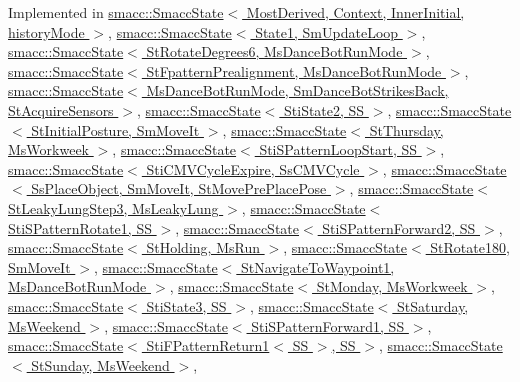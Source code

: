 Implemented in \hyperlink{classsmacc_1_1SmaccState_afc39f8e0ca4001b2159a100da2fccd0e}{smacc\+::\+Smacc\+State$<$ Most\+Derived, Context, Inner\+Initial, history\+Mode $>$}, \hyperlink{classsmacc_1_1SmaccState_afc39f8e0ca4001b2159a100da2fccd0e}{smacc\+::\+Smacc\+State$<$ State1, Sm\+Update\+Loop $>$}, \hyperlink{classsmacc_1_1SmaccState_afc39f8e0ca4001b2159a100da2fccd0e}{smacc\+::\+Smacc\+State$<$ St\+Rotate\+Degrees6, Ms\+Dance\+Bot\+Run\+Mode $>$}, \hyperlink{classsmacc_1_1SmaccState_afc39f8e0ca4001b2159a100da2fccd0e}{smacc\+::\+Smacc\+State$<$ St\+Fpattern\+Prealignment, Ms\+Dance\+Bot\+Run\+Mode $>$}, \hyperlink{classsmacc_1_1SmaccState_afc39f8e0ca4001b2159a100da2fccd0e}{smacc\+::\+Smacc\+State$<$ Ms\+Dance\+Bot\+Run\+Mode, Sm\+Dance\+Bot\+Strikes\+Back, St\+Acquire\+Sensors $>$}, \hyperlink{classsmacc_1_1SmaccState_afc39f8e0ca4001b2159a100da2fccd0e}{smacc\+::\+Smacc\+State$<$ Sti\+State2, S\+S $>$}, \hyperlink{classsmacc_1_1SmaccState_afc39f8e0ca4001b2159a100da2fccd0e}{smacc\+::\+Smacc\+State$<$ St\+Initial\+Posture, Sm\+Move\+It $>$}, \hyperlink{classsmacc_1_1SmaccState_afc39f8e0ca4001b2159a100da2fccd0e}{smacc\+::\+Smacc\+State$<$ St\+Thursday, Ms\+Workweek $>$}, \hyperlink{classsmacc_1_1SmaccState_afc39f8e0ca4001b2159a100da2fccd0e}{smacc\+::\+Smacc\+State$<$ Sti\+S\+Pattern\+Loop\+Start, S\+S $>$}, \hyperlink{classsmacc_1_1SmaccState_afc39f8e0ca4001b2159a100da2fccd0e}{smacc\+::\+Smacc\+State$<$ Sti\+C\+M\+V\+Cycle\+Expire, Ss\+C\+M\+V\+Cycle $>$}, \hyperlink{classsmacc_1_1SmaccState_afc39f8e0ca4001b2159a100da2fccd0e}{smacc\+::\+Smacc\+State$<$ Ss\+Place\+Object, Sm\+Move\+It, St\+Move\+Pre\+Place\+Pose $>$}, \hyperlink{classsmacc_1_1SmaccState_afc39f8e0ca4001b2159a100da2fccd0e}{smacc\+::\+Smacc\+State$<$ St\+Leaky\+Lung\+Step3, Ms\+Leaky\+Lung $>$}, \hyperlink{classsmacc_1_1SmaccState_afc39f8e0ca4001b2159a100da2fccd0e}{smacc\+::\+Smacc\+State$<$ Sti\+S\+Pattern\+Rotate1, S\+S $>$}, \hyperlink{classsmacc_1_1SmaccState_afc39f8e0ca4001b2159a100da2fccd0e}{smacc\+::\+Smacc\+State$<$ Sti\+S\+Pattern\+Forward2, S\+S $>$}, \hyperlink{classsmacc_1_1SmaccState_afc39f8e0ca4001b2159a100da2fccd0e}{smacc\+::\+Smacc\+State$<$ St\+Holding, Ms\+Run $>$}, \hyperlink{classsmacc_1_1SmaccState_afc39f8e0ca4001b2159a100da2fccd0e}{smacc\+::\+Smacc\+State$<$ St\+Rotate180, Sm\+Move\+It $>$}, \hyperlink{classsmacc_1_1SmaccState_afc39f8e0ca4001b2159a100da2fccd0e}{smacc\+::\+Smacc\+State$<$ St\+Navigate\+To\+Waypoint1, Ms\+Dance\+Bot\+Run\+Mode $>$}, \hyperlink{classsmacc_1_1SmaccState_afc39f8e0ca4001b2159a100da2fccd0e}{smacc\+::\+Smacc\+State$<$ St\+Monday, Ms\+Workweek $>$}, \hyperlink{classsmacc_1_1SmaccState_afc39f8e0ca4001b2159a100da2fccd0e}{smacc\+::\+Smacc\+State$<$ Sti\+State3, S\+S $>$}, \hyperlink{classsmacc_1_1SmaccState_afc39f8e0ca4001b2159a100da2fccd0e}{smacc\+::\+Smacc\+State$<$ St\+Saturday, Ms\+Weekend $>$}, \hyperlink{classsmacc_1_1SmaccState_afc39f8e0ca4001b2159a100da2fccd0e}{smacc\+::\+Smacc\+State$<$ Sti\+S\+Pattern\+Forward1, S\+S $>$}, \hyperlink{classsmacc_1_1SmaccState_afc39f8e0ca4001b2159a100da2fccd0e}{smacc\+::\+Smacc\+State$<$ Sti\+F\+Pattern\+Return1$<$ S\+S $>$, S\+S $>$}, \hyperlink{classsmacc_1_1SmaccState_afc39f8e0ca4001b2159a100da2fccd0e}{smacc\+::\+Smacc\+State$<$ St\+Sunday, Ms\+Weekend $>$}, 